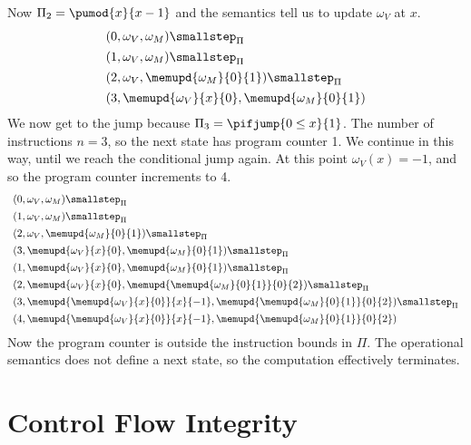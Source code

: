 \documentclass[11pt,twoside]{scrartcl}
\begin{document}
Now $\Pi_2 = \pumod{x}{x-1}$ and the semantics tell us to update $\omega_V$ at $x$.
\[
\begin{array}{l}
(0, \omega_V, \omega_M) \smallstep_\Pi \\[1ex] 
(1, \omega_V, \omega_M) \smallstep_\Pi \\[1ex]
(2, \omega_V, \memupd{\omega_M}{0}{1}) \smallstep_\Pi \\[1ex] 
(3, \memupd{\omega_V}{x}{0}, \memupd{\omega_M}{0}{1})
\end{array}
\]
We now get to the jump because $\Pi_3 = \pifjump{0 \le x}{1}$. The number of instructions $n=3$, so the next state has program counter 1.
We continue in this way, until we reach the conditional jump again. At this point $\omega_V(x) = -1$, and so the program counter increments to 4.
\[
\begin{array}{l}
(0, \omega_V, \omega_M) \smallstep_\Pi \\[1ex]
(1, \omega_V, \omega_M) \smallstep_\Pi \\[1ex] 
(2, \omega_V, \memupd{\omega_M}{0}{1}) \smallstep_\Pi \\[1ex] 
(3, \memupd{\omega_V}{x}{0}, \memupd{\omega_M}{0}{1}) \smallstep_\Pi \\[1ex]
(1, \memupd{\omega_V}{x}{0}, \memupd{\omega_M}{0}{1}) \smallstep_\Pi \\[1ex]
(2, \memupd{\omega_V}{x}{0}, \memupd{\memupd{\omega_M}{0}{1}}{0}{2}) \smallstep_\Pi \\[1ex]
(3, \memupd{\memupd{\omega_V}{x}{0}}{x}{-1}, \memupd{\memupd{\omega_M}{0}{1}}{0}{2}) \smallstep_\Pi \\[1ex]
(4, \memupd{\memupd{\omega_V}{x}{0}}{x}{-1}, \memupd{\memupd{\omega_M}{0}{1}}{0}{2})
\end{array}
\]
Now the program counter is outside the instruction bounds in $\Pi$. The operational semantics does not define a next state, so the computation effectively terminates.

\section{Control Flow Integrity}
\end{document}
